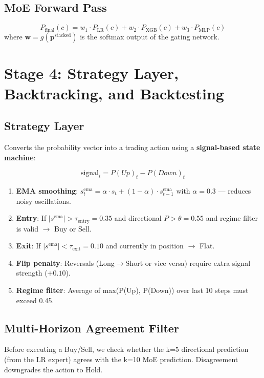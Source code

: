 \documentclass[12pt, a4paper]{article}
\begin{document}
\subsection{MoE Forward Pass}
\[
P_{\text{final}}(c) = w_1 \cdot P_{\text{LR}}(c) + w_2 \cdot P_{\text{XGB}}(c) + w_3 \cdot P_{\text{MLP}}(c)
\]
where $\mathbf{w} = g(\mathbf{p}^{\text{stacked}})$ is the softmax output of the gating network.

\section{Stage 4: Strategy Layer, Backtracking, and Backtesting}

\subsection{Strategy Layer}

Converts the probability vector into a trading action using a \textbf{signal-based state machine}:

\[
\text{signal}_t = P(Up)_t - P(Down)_t
\]

\begin{enumerate}
  \item \textbf{EMA smoothing}: $s_t^{\text{ema}} = \alpha \cdot s_t + (1-\alpha) \cdot s_{t-1}^{\text{ema}}$ with $\alpha=0.3$ — reduces noisy oscillations.
  \item \textbf{Entry}: If $|s^{\text{ema}}| > \tau_{\text{entry}} = 0.35$ and directional $P > \theta = 0.55$ and regime filter is valid $\to$ Buy or Sell.
  \item \textbf{Exit}: If $|s^{\text{ema}}| < \tau_{\text{exit}} = 0.10$ and currently in position $\to$ Flat.
  \item \textbf{Flip penalty}: Reversals (Long$\to$Short or vice versa) require extra signal strength ($+0.10$).
  \item \textbf{Regime filter}: Average of max(P(Up), P(Down)) over last 10 steps must exceed 0.45.
\end{enumerate}

\subsection{Multi-Horizon Agreement Filter}

Before executing a Buy/Sell, we check whether the k=5 directional prediction (from the LR expert) agrees with the k=10 MoE prediction. Disagreement downgrades the action to Hold.
\end{document}
